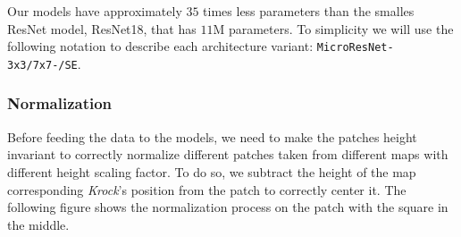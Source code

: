 \documentclass[../document.tex]{subfiles}
\begin{document}
Our models have approximately $35$ times less parameters than the smalles ResNet model, ResNet18, that has $11$M parameters. To simplicity we will use the following notation to describe each architecture variant: \texttt{MicroResNet-{3x3/7x7}-{/SE}}.

\subsubsection{Normalization}
Before feeding the data to the models, we need to make the patches height invariant to correctly normalize different patches taken from different maps with different height scaling factor. To do so, we subtract the height of the map corresponding \emph{Krock}'s position from the patch to correctly center it. The following figure shows the normalization process on the patch with the square in the middle.
\end{document}
